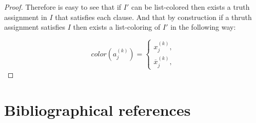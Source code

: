 \documentclass[9pt]{../document-types/entcs} \usepackage{../document-types/entcsmacro}
\begin{document}
\begin{proof}
    Therefore is easy to see that if $I'$ can be list-colored then exists a truth assignment in $I$ that satisfies each clause. And that by construction if a thruth assignment satisfies $I$ then exists a list-coloring of $I'$ in the following way:

    \[color(a_j^{(k)})=
    \begin{cases}
       x_j^{(k)}, \text{}\\
       \overline{x}_j^{(k)},
    \end{cases}
    \]
\end{proof}




\section{Bibliographical references}\label{references}

\begin{thebibliography}{10}\label{bibliography}

\end{thebibliography}
\end{document}
